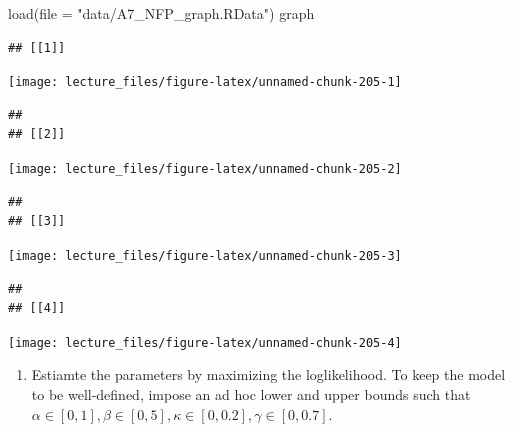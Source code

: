 \documentclass[
]{book}
\newenvironment{Shaded}{\begin{snugshade}}{\end{snugshade}}
\newcommand{\AttributeTok}[1]{\textcolor[rgb]{0.77,0.63,0.00}{#1}}
\newcommand{\FunctionTok}[1]{\textcolor[rgb]{0.00,0.00,0.00}{#1}}
\newcommand{\NormalTok}[1]{#1}
\newcommand{\StringTok}[1]{\textcolor[rgb]{0.31,0.60,0.02}{#1}}
\providecommand{\tightlist}{%
  \setlength{\itemsep}{0pt}\setlength{\parskip}{0pt}}
\begin{document}
\begin{Shaded}
\begin{Highlighting}[]
\FunctionTok{load}\NormalTok{(}\AttributeTok{file =} \StringTok{"data/A7\_NFP\_graph.RData"}\NormalTok{)}
\NormalTok{graph}
\end{Highlighting}
\end{Shaded}

\begin{verbatim}
## [[1]]
\end{verbatim}

\begin{center}\texttt{[image: lecture\_files/figure-latex/unnamed-chunk-205-1]} \end{center}

\begin{verbatim}
## 
## [[2]]
\end{verbatim}

\begin{center}\texttt{[image: lecture\_files/figure-latex/unnamed-chunk-205-2]} \end{center}

\begin{verbatim}
## 
## [[3]]
\end{verbatim}

\begin{center}\texttt{[image: lecture\_files/figure-latex/unnamed-chunk-205-3]} \end{center}

\begin{verbatim}
## 
## [[4]]
\end{verbatim}

\begin{center}\texttt{[image: lecture\_files/figure-latex/unnamed-chunk-205-4]} \end{center}

\begin{enumerate}
\def\labelenumi{\arabic{enumi}.}
\setcounter{enumi}{3}
\tightlist
\item
  Estiamte the parameters by maximizing the loglikelihood. To keep the model to be well-defined, impose an ad hoc lower and upper bounds such that \(\alpha \in [0, 1], \beta \in [0, 5], \kappa \in [0, 0.2], \gamma \in [0, 0.7]\).
\end{enumerate}
\end{document}
